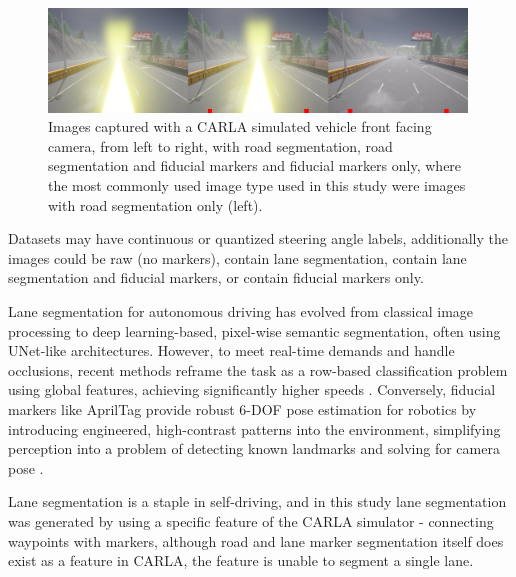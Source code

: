 \begin{figure}[h]
\centering
\includegraphics[width=0.99\textwidth]{Figures/Methods/carla_dataset_seg_segfid_fid.jpg}
\caption{Images captured with a CARLA simulated vehicle front facing camera, from left to right, with road segmentation, road segmentation and fiducial markers and fiducial markers only, where the most commonly used image type used in this study were images with road segmentation only (left).}
\label{fig:carla_dataset_seg_segfid_fid}
\end{figure}

Datasets may have continuous or quantized steering angle labels, additionally the images could be raw (no markers), contain lane segmentation, contain lane segmentation and fiducial markers, or contain fiducial markers only.
 
Lane segmentation for autonomous driving has evolved from classical image processing to deep learning-based, pixel-wise semantic segmentation, often using UNet-like architectures. However, to meet real-time demands and handle occlusions, recent methods reframe the task as a row-based classification problem using global features, achieving significantly higher speeds \cite{qin2020ultra}. Conversely, fiducial markers like AprilTag provide robust 6-DOF pose estimation for robotics by introducing engineered, high-contrast patterns into the environment, simplifying perception into a problem of detecting known landmarks and solving for camera pose \cite{olson2011tags}.

Lane segmentation is a staple in self-driving, and in this study lane segmentation was generated by using a specific feature of the CARLA simulator - connecting waypoints with markers, although road and lane marker segmentation itself does exist as a feature in CARLA, the feature is unable to segment a single lane.


